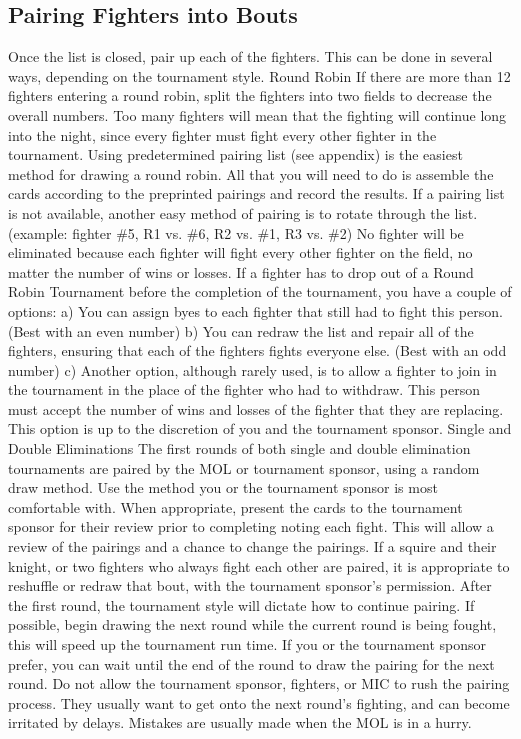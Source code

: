 \documentclass{article}
\begin{document}
\subsection{Pairing Fighters into Bouts}
Once the list is closed, pair up each of the fighters. This can be done in several ways, depending on the
tournament style.
Round Robin
If there are more than 12 fighters entering a round robin, split the fighters into two fields to decrease the
overall numbers. Too many fighters will mean that the fighting will continue long into the night, since
every fighter must fight every other fighter in the tournament.
Using predetermined pairing list (see appendix) is the easiest method for drawing a round robin. All that
you will need to do is assemble the cards according to the preprinted pairings and record the results. If a
pairing list is not available, another easy method of pairing is to rotate through the list. (example: fighter
\#5, R1 vs. \#6, R2 vs. \#1, R3 vs. \#2) No fighter will be eliminated because each fighter will fight every
other fighter on the field, no matter the number of wins or losses.
If a fighter has to drop out of a Round Robin Tournament before the completion of the tournament, you
have a couple of options:
a) You can assign byes to each fighter that still had to fight this person. (Best with an even number)
b) You can redraw the list and repair all of the fighters, ensuring that each of the fighters fights everyone
else. (Best with an odd number)
c) Another option, although rarely used, is to allow a fighter to join in the tournament in the place of the
fighter who had to withdraw. This person must accept the number of wins and losses of the fighter that
they are replacing. This option is up to the discretion of you and the tournament sponsor.
Single and Double Eliminations
The first rounds of both single and double elimination tournaments are paired by the MOL or tournament
sponsor, using a random draw method. Use the method you or the tournament sponsor is most
comfortable with.
When appropriate, present the cards to the tournament sponsor for their review prior to completing noting
each fight. This will allow a review of the pairings and a chance to change the pairings. If a squire and
their knight, or two fighters who always fight each other are paired, it is appropriate to reshuffle or redraw
that bout, with the tournament sponsor’s permission.
After the first round, the tournament style will dictate how to continue pairing. If possible, begin drawing
the next round while the current round is being fought, this will speed up the tournament run time. If you
or the tournament sponsor prefer, you can wait until the end of the round to draw the pairing for the next
round. Do not allow the tournament sponsor, fighters, or MIC to rush the pairing process. They usually
want to get onto the next round’s fighting, and can become irritated by delays. Mistakes are usually made
when the MOL is in a hurry.
\end{document}
